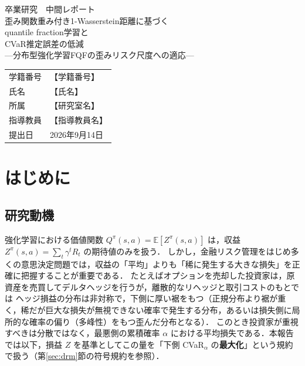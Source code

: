\documentclass[a4paper,10pt]{jsarticle}
\title{\vspace{-1cm}}
\author{}
\date{}
\theoremstyle{definition}
\newcommand{\E}{\mathbb{E}}
\begin{document}
\begin{titlepage}
\begin{center}
\vspace*{3cm}
{\LARGE 卒業研究　中間レポート}\\[1.5cm]
{\Large 歪み関数重み付き1-Wasserstein距離に基づく\\[0.3cm]
quantile fraction学習と\\[0.3cm]
CVaR推定誤差の低減}\\[0.6cm]
{\large ---分布型強化学習FQFの歪みリスク尺度への適応---}\\[3cm]

\begin{tabular}{ll}
学籍番号 & 【学籍番号】\\[0.3cm]
氏名 & 【氏名】\\[0.3cm]
所属 & 【研究室名】\\[0.3cm]
指導教員 & 【指導教員名】\\[0.3cm]
提出日 & 2026年9月14日\\
\end{tabular}
\vfill
\end{center}
\end{titlepage}

\tableofcontents
\newpage

\section{はじめに}
\label{sec:intro}

\subsection{研究動機}
強化学習における価値関数 $Q^\pi(s,a)=\E[Z^\pi(s,a)]$ は，収益 $Z^\pi(s,a)=\sum_t\gamma^t R_t$ の期待値のみを扱う．
しかし，金融リスク管理をはじめ多くの意思決定問題では，収益の「平均」よりも「稀に発生する大きな損失」を正確に把握することが重要である．
たとえばオプションを売却した投資家は，原資産を売買してデルタヘッジを行うが，離散的なリヘッジと取引コストのもとでは
ヘッジ損益の分布は非対称で，下側に厚い裾をもつ（正規分布より裾が重く，稀だが巨大な損失が無視できない確率で発生する分布，あるいは損失側に局所的な確率の偏り（多峰性）をもつ歪んだ分布となる）．
このとき投資家が重視すべきは分散ではなく，最悪側の累積確率 $\alpha$ における平均損失である．本報告では以下，損益 $Z$ を基準としてこの量を「下側 CVaR$_\alpha$ の\textbf{最大化}」という規約で扱う（第\ref{sec:drm}節の符号規約を参照）\cite{rockafellar2000cvar}．
\end{document}
